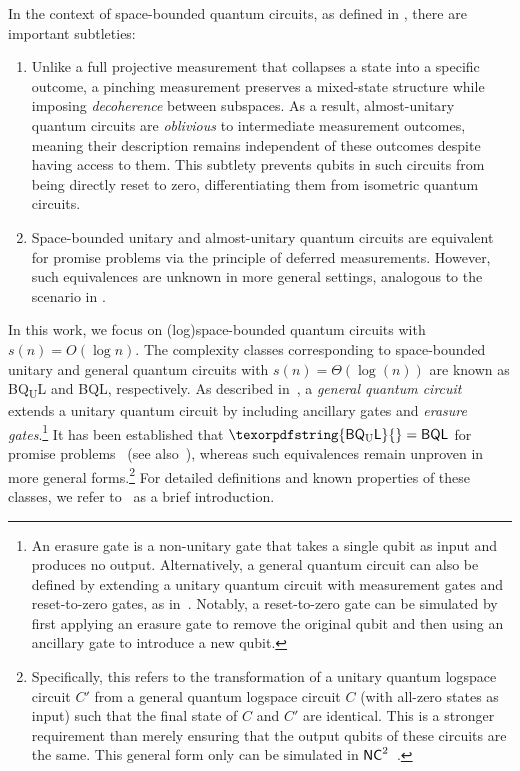 \documentclass[11pt, a4paper]{article}
\numberwithin{equation}{section}
\numberwithin{figure}{section}
\newcommand{\BQL}{\textnormal{\textsf{BQL}}\xspace}
\newcommand{\BQUL}{\texorpdfstring{\textnormal{\textsf{BQ}\textsubscript{U}\textsf{L}}}\xspace}
\newcommand{\NC}{\textnormal{\textsf{NC}}\xspace}
\begin{document}
\begin{remark}
    \label{remark:subtleties-space-bounded-circuits}
    In the context of space-bounded quantum circuits, as defined in , there are important subtleties: 
    \begin{enumerate}[label={\upshape(\arabic*)}, topsep=0.33em, itemsep=0.33em, parsep=0.33em, leftmargin=2em]
        \item Unlike a full projective measurement that collapses a state into a specific outcome, a pinching measurement preserves a mixed-state structure while imposing \textit{decoherence} between subspaces. As a result, almost-unitary quantum circuits are \textit{oblivious} to intermediate measurement outcomes, meaning their description remains independent of these outcomes despite having access to them. This subtlety prevents qubits in such circuits from being directly reset to zero, differentiating them from isometric quantum circuits. 
        \label{remarkitem:pinching-measurement}
        \item Space-bounded unitary and almost-unitary quantum circuits are equivalent for promise problems via the principle of deferred measurements. However, such equivalences are unknown in more general settings, analogous to the scenario in . 
    \end{enumerate}
\end{remark}

In this work, we focus on (log)space-bounded quantum circuits with $s(n) = O(\log{n})$. 
The complexity classes corresponding to space-bounded unitary and general quantum circuits with $s(n) = \Theta(\log(n))$ are known as \BQUL{} and \BQL{}, respectively. 
As described in~\cite[Section 2.3]{VW16}, a \textit{general quantum circuit} extends a unitary quantum circuit by including ancillary gates and \textit{erasure gates}.\footnote{An erasure gate is a non-unitary gate that takes a single qubit as input and produces no output. Alternatively, a general quantum circuit can also be defined by extending a unitary quantum circuit with measurement gates and reset-to-zero gates, as in~\cite{FR21,GR22}. Notably, a reset-to-zero gate can be simulated by first applying an erasure gate to remove the original qubit and then using an ancillary gate to introduce a new qubit.}  
It has been established that $\BQUL{}=\BQL{}$ for promise problems~\cite{FR21} (see also~\cite{GRZ21,GR22}), whereas such equivalences remain unproven in more general forms.\footnote{Specifically, this refers to the transformation of a unitary quantum logspace circuit $C'$ from a general quantum logspace circuit $C$ (with all-zero states as input) such that the final state of $C$ and $C'$ are identical. This is a stronger requirement than merely ensuring that the output qubits of these circuits are the same. This general form only can be simulated in $\NC^2$~\cite{Wat99,Wat03}.\label{footref:BQL-eq-BQUL-strong-forms}}
For detailed definitions and known properties of these classes, we refer to~\cite[Section 2.3]{LGLW23} as a brief introduction. 
\end{document}
